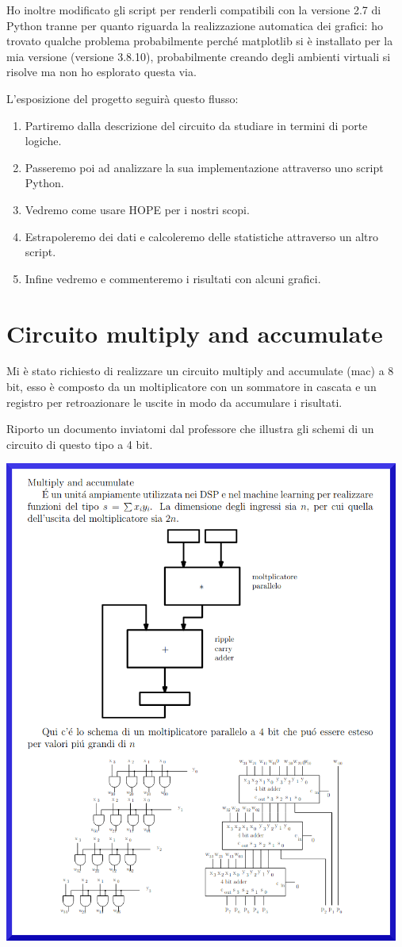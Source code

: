 \documentclass[12pt, letterpaper]{article}
\begin{document}
Ho inoltre modificato gli script per renderli compatibili con la versione 2.7 di Python tranne per quanto riguarda la realizzazione automatica dei grafici: ho trovato qualche problema probabilmente perché matplotlib si è installato per la mia versione (versione 3.8.10), probabilmente creando degli ambienti virtuali si risolve ma non ho esplorato questa via.

L'esposizione del progetto seguirà questo flusso: 
\begin{enumerate}
\item Partiremo dalla descrizione del circuito da studiare in termini di porte logiche.
\item Passeremo poi ad analizzare la sua implementazione attraverso uno script Python.
\item Vedremo come usare HOPE per i nostri scopi.
\item Estrapoleremo dei dati e calcoleremo delle statistiche attraverso un altro script.
\item Infine vedremo e commenteremo i risultati con alcuni grafici.
\end{enumerate}

\section{Circuito multiply and accumulate}

Mi è stato richiesto di realizzare un circuito multiply and accumulate (mac) a 8 bit, esso è composto da un moltiplicatore con un sommatore in cascata e un registro per retroazionare le uscite in modo da accumulare i risultati.

Riporto un documento inviatomi dal professore che illustra gli schemi di un circuito di questo tipo a 4 bit.

\includegraphics[width=13cm]{mac.png}
\end{document}
